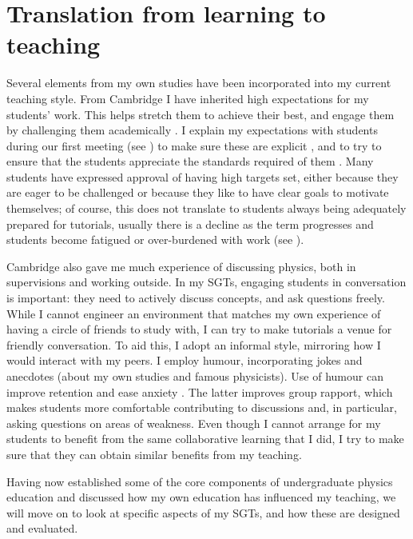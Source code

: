 \section{Translation from learning to teaching}

Several elements from my own studies have been incorporated into my current teaching style. From Cambridge I have inherited high expectations for my students' work. This helps stretch them to achieve their best, and engage them by challenging them academically \citep{Bamber2015}. I explain my expectations with students during our first meeting (see ) to make sure these are explicit \citep{Butcher2015}, and to try to ensure that the students appreciate the standards required of them \citep[chapter 8]{Ramsden1992}. Many students have expressed approval of having high targets set, either because they are eager to be challenged or because they like to have clear goals to motivate themselves; of course, this does not translate to students always being adequately prepared for tutorials, usually there is a decline as the term progresses and students become fatigued or over-burdened with work (see ).

Cambridge also gave me much experience of discussing physics, both in supervisions and working outside. In my SGTs, engaging students in conversation is important: they need to actively discuss concepts, and ask questions freely. While I cannot engineer an environment that matches my own experience of having a circle of friends to study with, I can try to make tutorials a venue for friendly conversation. To aid this, I adopt an informal style, mirroring how I would interact with my peers. I employ humour, incorporating jokes and anecdotes (about my own studies and famous physicists). Use of humour can improve retention and ease anxiety \citep[e.g.,][and references therein]{Korobkin1988,Lesser2008}. The latter improves group rapport, which makes students more comfortable contributing to discussions and, in particular, asking questions on areas of weakness. Even though I cannot arrange for my students to benefit from the same collaborative learning that I did, I try to make sure that they can obtain similar benefits from my teaching.

Having now established some of the core components of undergraduate physics education and discussed how my own education has influenced my teaching, we will move on to look at specific aspects of my SGTs, and how these are designed and evaluated.
